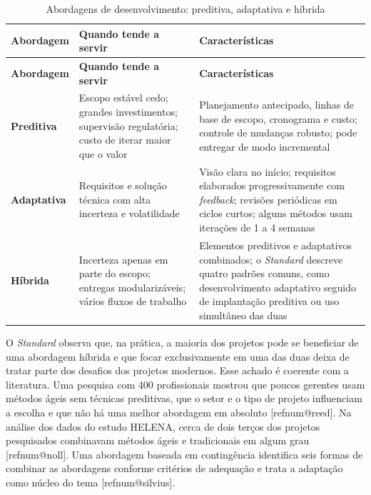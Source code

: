 \documentclass[11pt,a4paper]{article}
\makeatletter
\newcommand{\refnum}[1]{\csname refnum@#1\endcsname}
\newcommand{\cit}[1]{[\refnum{#1}]}
\newcommand{\SingleSpacing}{}
\newcommand{\fontetab}[1]{\par\vspace{3pt}{\small\noindent Fonte: #1\par}}
\makeatother
\begin{document}
\begingroup\SingleSpacing\small
\begin{longtable}{@{}>{\raggedright\arraybackslash}p{}>{\raggedright\arraybackslash}p{}>{\raggedright\arraybackslash}p{}@{}}
\caption{Abordagens de desenvolvimento: preditiva, adaptativa e híbrida}\label{tab:t4}\\
\toprule
\textbf{Abordagem} & \textbf{Quando tende a servir} & \textbf{Características}\\
\midrule
\endfirsthead
\toprule
\textbf{Abordagem} & \textbf{Quando tende a servir} & \textbf{Características}\\
\midrule
\endhead
\bottomrule
\endfoot
\bottomrule
\endlastfoot
\textbf{Preditiva} & Escopo estável cedo; grandes investimentos; supervisão regulatória; custo de iterar maior que o valor & Planejamento antecipado, linhas de base de escopo, cronograma e custo; controle de mudanças robusto; pode entregar de modo incremental\\[3pt]
\textbf{Adaptativa} & Requisitos e solução técnica com alta incerteza e volatilidade & Visão clara no início; requisitos elaborados progressivamente com \textit{feedback}; revisões periódicas em ciclos curtos; alguns métodos usam iterações de 1 a 4 semanas\\[3pt]
\textbf{Híbrida} & Incerteza apenas em parte do escopo; entregas modularizáveis; vários fluxos de trabalho & Elementos preditivos e adaptativos combinados; o \textit{Standard} descreve quatro padrões comuns, como desenvolvimento adaptativo seguido de implantação preditiva ou uso simultâneo das duas\\[3pt]
\end{longtable}
\endgroup
\fontetab{Elaborado pelos autores (2026), com base em \cit{pmi}.}

O \textit{Standard} observa que, na prática, a maioria dos projetos pode se beneficiar de uma abordagem híbrida e que focar exclusivamente em uma das duas deixa de tratar parte dos desafios dos projetos modernos. Esse achado é coerente com a literatura. Uma pesquisa com 400 profissionais mostrou que poucos gerentes usam métodos ágeis sem técnicas preditivas, que o setor e o tipo de projeto influenciam a escolha e que não há uma melhor abordagem em absoluto [\refnum{reed}]. Na análise dos dados do estudo HELENA, cerca de dois terços dos projetos pesquisados combinavam métodos ágeis e tradicionais em algum grau [\refnum{noll}]. Uma abordagem baseada em contingência identifica seis formas de combinar as abordagens conforme critérios de adequação e trata a adaptação como núcleo do tema [\refnum{silvius}].
\end{document}
